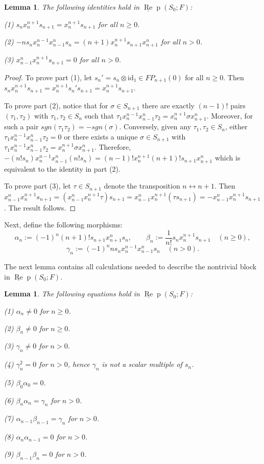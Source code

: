\documentclass{amsart}
\newtheorem{lemma}[theorem]{Lemma}
\theoremstyle{definition}
\newcommand{\id}{\text{id}}
\def\uRep{\underline{\operatorname{Re}}\!\operatorname{p}}
\renewcommand{\1}{_{(1)}}
\renewcommand{\2}{_{(2)}}
\newcommand{\3}{_{(3)}}
\newcommand{\4}{_{(4)}}
\begin{document}
\begin{lemma}\label{calcs} The following identities hold in $\uRep(S_0; F)$:

(1) $s_n x_n^{n+1}s_{n+1}=x_n^{n+1}s_{n+1}$ for all $n\geq 0$.

(2) $-ns_nx_n^{n-1}x_{n-1}^ns_n=(n+1)x_n^{n+1}s_{n+1}x^n_{n+1}$ for all $n> 0$.

(3) $x_{n-1}^nx_n^{n+1}s_{n+1}=0$ for all $n>0$.
\end{lemma}

\begin{proof} To prove part (1), let $s_n'=s_n\otimes\id_1\in FP_{n+1}(0)$ for all $n\geq 0$.  Then $s_n x_n^{n+1}s_{n+1}=x_n^{n+1}s_n's_{n+1}=x_n^{n+1}s_{n+1}$.

To prove part (2), notice that for $\sigma\in S_{n+1}$ there are exactly $(n-1)!$ pairs $(\tau_1, \tau_2)$ with $\tau_1, \tau_2\in S_n$ such that $\tau_1x_n^{n-1}x_{n-1}^n\tau_2=x_n^{n+1}\sigma x_{n+1}^n$.  Moreover, for such a pair $sgn(\tau_1\tau_2)=-sgn(\sigma)$.  Conversely, given any $\tau_1, \tau_2\in S_n$, either $\tau_1x_n^{n-1}x_{n-1}^n\tau_2=0$ or there exists a unique $\sigma\in S_{n+1}$ with $\tau_1x_n^{n-1}x_{n-1}^n\tau_2=x_n^{n+1}\sigma x_{n+1}^n$.  Therefore, $-(n!s_n)x_n^{n-1}x_{n-1}^n(n!s_n)=(n-1)!x_n^{n+1}(n+1)!s_{n+1}x^n_{n+1}$ which is equivalent to the identity in part (2).

To prove part (3), let $\tau\in S_{n+1}$ denote the transposition $n\leftrightarrow n+1$.  Then 
$x_{n-1}^nx_n^{n+1}s_{n+1}=(x_{n-1}^nx_n^{n+1}\tau) s_{n+1}=x_{n-1}^nx_n^{n+1}(\tau s_{n+1})=-x_{n-1}^nx_n^{n+1}s_{n+1}$.  The result follows.
\end{proof}

Next, define the following morphisms:
\begin{equation*} \alpha_n:=(-1)^n(n+1)!s_{n+1}x^n_{n+1}s_{n},\qquad\beta_n:=\frac{1}{n!}s_nx^{n+1}_ns_{n+1}\quad (n\geq0),\end{equation*}
\begin{equation*}\gamma_n:=(-1)^nns_nx_n^{n-1}x_{n-1}^ns_n\quad(n>0).\end{equation*}


The next lemma contains all calculations needed to describe the nontrivial block in $\uRep(S_0; F)$.

\begin{lemma}\label{calculations}The following equations hold in $\uRep(S_0; F)$:

(1) $\alpha_n\not=0$ for $n\geq0$.

(2) $\beta_n\not=0$ for $n\geq0$.

(3) $\gamma_n\not=0$ for $n>0$.

(4) $\gamma_n^2=0$ for $n>0$, hence $\gamma_n$ is not a scalar multiple of $s_n$.

(5) $\beta_0\alpha_0=0$.

(6) $\beta_n\alpha_n=\gamma_n$ for $n>0$.

(7) $\alpha_{n-1}\beta_{n-1}=\gamma_n$ for $n>0$.

(8) $\alpha_n\alpha_{n-1}=0$ for $n>0$.

(9) $\beta_{n-1}\beta_n=0$ for $n>0$.

\end{lemma}
\end{document}
